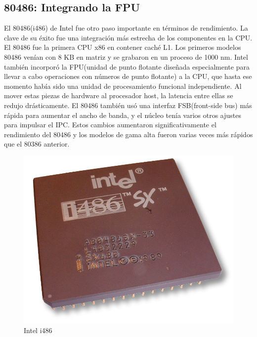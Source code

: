 \subsection{80486: Integrando la FPU}
El 80486(i486) de Intel fue otro paso importante en términos de rendimiento. La clave de su éxito fue una integración más estrecha de los componentes 
en la CPU. El 80486 fue la primera CPU x86 en contener caché L1. Los primeros modelos 80486 venían con 8 KB en matriz y se grabaron en un proceso de 1000 nm.
Intel también incorporó la FPU(unidad de punto flotante diseñada especialmente para llevar a cabo operaciones con números de punto flotante) a la CPU, que hasta ese 
momento había sido una unidad de procesamiento funcional independiente. Al mover estas piezas de hardware al procesador host, la latencia entre ellas se redujo 
drásticamente. El 80486 también usó una interfaz FSB(front-side bus) más rápida para aumentar el ancho de banda, y el núcleo 
tenía varios otros ajustes para impulsar el IPC. Estos cambios aumentaron significativamente el rendimiento del 80486 y los modelos de gama alta fueron varias 
veces más rápidos que el 80386 anterior. 

\begin{figure}[htb]
	\centering
	\includegraphics[scale = 0.15]{Graphics/Intel_80486sx.jpg}
	\caption{Intel i486}
	\label{fig:21}
\end{figure}

